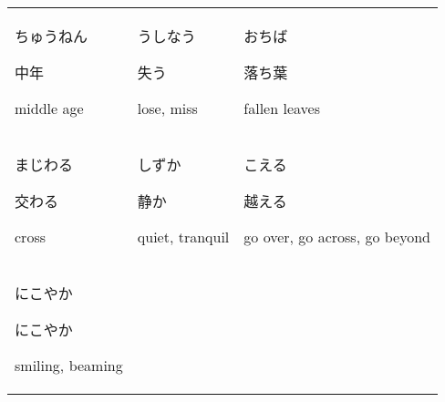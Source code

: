 \documentclass[12pt, a4j, landscape, dvipdfmx]{utarticle}
\begin{document}
    
    \begin{minipage}[t][0pt]{\linewidth }
        \noindent 
        \begin{tabular}{||p{5.5cm}||p{5.5cm}||p{5.5cm}||}
            \hhline{|t:=:t:=:t:=:t|} \rule{0pt}{3ex} \hspace*{-.4cm} {\LARGE ちゅうねん}\newline \rule{0pt}{3ex} \hspace*{.4cm} {\small 中年}\newline \rule{0pt}{3ex} \hspace*{.425cm} {\small middle age}&\rule{0pt}{3ex} \hspace*{-.4cm} {\LARGE うしなう}\newline \rule{0pt}{3ex} \hspace*{.4cm} {\small 失う}\newline \rule{0pt}{3ex} \hspace*{.425cm} {\small lose, miss}&\rule{0pt}{3ex} \hspace*{-.4cm} {\LARGE おちば}\newline \rule{0pt}{3ex} \hspace*{.4cm} {\small 落ち葉}\newline \rule{0pt}{3ex} \hspace*{.425cm} {\small fallen leaves}\tabularnewline \hhline{|:=::=::=:|} \rule{0pt}{3ex} \hspace*{-.4cm} {\LARGE まじわる}\newline \rule{0pt}{3ex} \hspace*{.4cm} {\small 交わる}\newline \rule{0pt}{3ex} \hspace*{.425cm} {\small cross}&\rule{0pt}{3ex} \hspace*{-.4cm} {\LARGE しずか}\newline \rule{0pt}{3ex} \hspace*{.4cm} {\small 静か}\newline \rule{0pt}{3ex} \hspace*{.425cm} {\small quiet, tranquil}&\rule{0pt}{3ex} \hspace*{-.4cm} {\LARGE こえる}\newline \rule{0pt}{3ex} \hspace*{.4cm} {\small 越える}\newline \rule{0pt}{3ex} \hspace*{.425cm} {\small go over, go across, go beyond}\tabularnewline \hhline{|:=::=::=:|} \rule{0pt}{3ex} \hspace*{-.4cm} {\LARGE にこやか}\newline \rule{0pt}{3ex} \hspace*{.4cm} {\small にこやか}\newline \rule{0pt}{3ex} \hspace*{.425cm} {\small smiling, beaming}&\rule{0pt}{3ex} \hspace*{-.4cm} {\LARGE 
\end{tabular}
\end{minipage}
\end{document}

